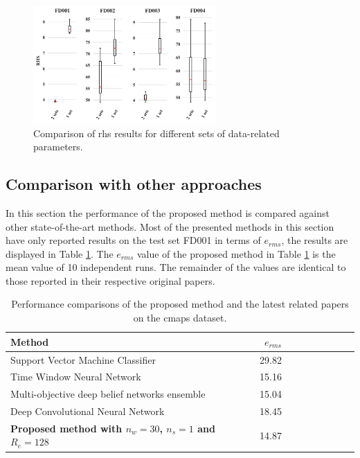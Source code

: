 \begin{figure}[!htb]
\centering
\includegraphics[width=0.62\textwidth]{../img/rhs_comparisson.png}
\caption{Comparison of \gls{rhs} results for different sets of data-related parameters.}
\label{fig:scores_rhs}
\end{figure}

\subsection{Comparison with other approaches}

In this section the performance of the proposed method is compared against other state-of-the-art methods. Most of the presented methods in this section have only reported results on the test set FD001 in terms of $e_{rms}$, the results are displayed in Table \ref{table:results_comparison}. The $e_{rms}$ value of the proposed method in Table \ref{table:results_comparison} is the mean value of 10 independent runs. The remainder of the values are identical to those reported in their respective original papers.

\begin{table}[!htb]
\centering
\begin{tabular}{l | r r r r | r r r r}
	\hline	
	Method & $e_{rms}$ \\
  	\hline
  	Support Vector Machine Classifier \citep{Louen2013} & 29.82\\
  	Time Window Neural Network \citep{Lim2016} & 15.16\\
  	Multi-objective deep belief networks ensemble \citep{Zhang2016} & 15.04\\
  	Deep Convolutional Neural Network \citep{Babu2016} & 18.45\\
  	\textbf{Proposed method with $n_w = 30$, $n_s=1$ and $R_e = 128$} & 14.87\\
  	\hline
\end{tabular}
\caption{Performance comparisons of the proposed method and the latest related papers on the \gls{cmaps} dataset.}
\label{table:results_comparison}
\end{table}

